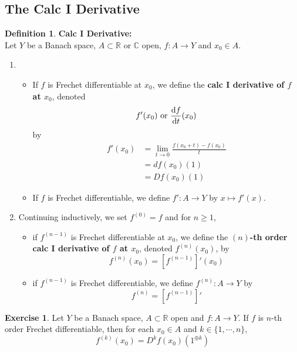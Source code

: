 \documentclass[12pt]{amsart}
\theoremstyle{definition}
\newtheorem{defn}[definition]{Definition}
\newtheorem{ex}[definition]{Exercise}
\newcommand{\C}{\mathbb{C}}
\newcommand{\R}{\mathbb{R}}
\newcommand{\tbf}[1]{\textbf{#1}}
\DeclareMathOperator*{\0}{\mbf{0}}
\DeclareMathOperator*{\1}{\mbf{1}}
\newcommand{\lex}[1]{\label{ex:#1}}
\newcommand{\ld}[1]{\label{defn:#1}}
\begin{document}
	\subsection{The Calc I Derivative}
	\begin{defn} \ld{}\tbf{Calc I Derivative:}\\
	Let $Y$ be a Banach space, $A \subset \R$ or $\C$ open, $f:A \rightarrow Y$ and $x_0 \in A$. 
	\begin{enumerate}
	\item 
	\begin{itemize}
	\item If $f$ is Frechet differentiable at $x_0$, we define the \tbf{calc I derivative of $f$ at $x_0$}, denoted $$f'(x_0) \text{ or } \dv{f}{t}{(x_0)}$$ by
	\begin{align*}
	f'(x_0) 
	&= \lim_{t \rightarrow 0} \frac{f(x_0 + t) - f(x_0)}{t} \\
	&= df(x_0)(1) \\
	&= Df(x_0)(1)
	\end{align*}
	\item If $f$ is Frechet differentiable, we define $f':A \rightarrow Y$ by $x \mapsto f'(x)$. 
	\end{itemize}
	\item Continuing inductively, we set $f^{(0)} = f$ and for $n \geq 1$,
	\begin{itemize}
	\item  if $f^{(n-1)}$ is Frechet differentiable at $x_0$, we define the \tbf{$(n)$-th order calc I derivative of $f$ at $x_0$}, denoted $f^{(n)}(x_0)$, by $$f^{(n)}(x_0) = [f^{(n-1)}]'(x_0)$$ 
	\item if $f^{(n-1)}$ is Frechet differentiable, we define $f^{(n)}:A \rightarrow Y$ by $$f^{(n)} = [f^{(n - 1)}]'$$ 
	\end{itemize}
	\end{enumerate}
	\end{defn}	
	
	\begin{ex} \lex{}
	Let $Y$ be a Banach space, $A \subset \R$ open and $f:A \rightarrow Y$. If $f$ is $n$-th order Frechet differentiable, then for each $x_0 \in A$ and $k \in \{1, \cdots, n\}$, $$f^{(k)}(x_0) = D^kf(x_0)(1^{\oplus k})$$
	\end{ex}
	
\end{document}
